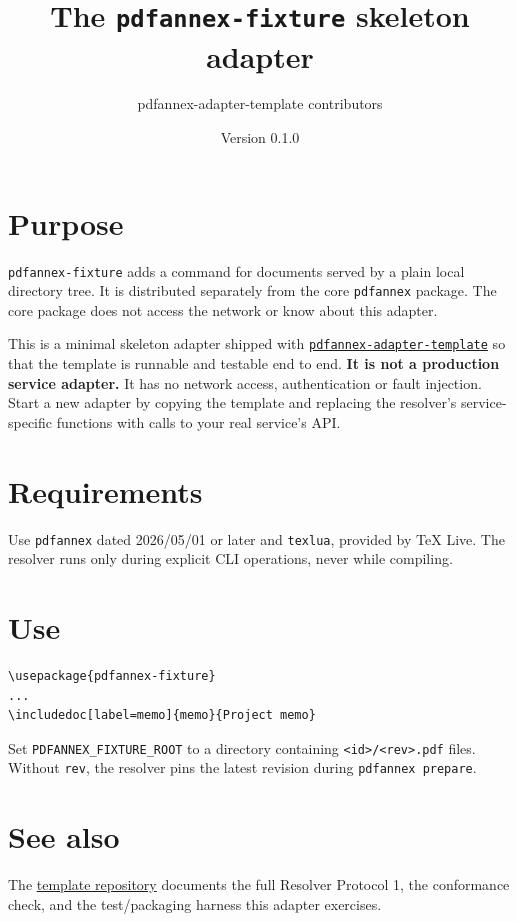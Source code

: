 \documentclass{article}
\title{The \texttt{pdfannex-fixture} skeleton adapter}
\author{pdfannex-adapter-template contributors}
\date{Version 0.1.0} %
\begin{document}
\maketitle

\section{Purpose}

\texttt{pdfannex-fixture} adds a command for documents served by a plain
local directory tree. It is distributed separately from the core
\texttt{pdfannex} package. The core package does not access the network or
know about this adapter.

This is a minimal skeleton adapter shipped with
\href{https://github.com/nocona71/pdfannex-adapter-template}
{\texttt{pdfannex-adapter-template}} so that the template is runnable and
testable end to end. \textbf{It is not a production service adapter.} It has
no network access, authentication or fault injection. Start a new adapter by
copying the template and replacing the resolver's service-specific
functions with calls to your real service's API.

\section{Requirements}

Use \texttt{pdfannex} dated 2026/05/01 or later and \texttt{texlua}, provided
by TeX Live. The resolver runs only during explicit CLI operations, never
while compiling.

\section{Use}

\begin{verbatim}
\usepackage{pdfannex-fixture}
...
\includedoc[label=memo]{memo}{Project memo}
\end{verbatim}

Set \texttt{PDFANNEX\_FIXTURE\_ROOT} to a directory containing
\texttt{<id>/<rev>.pdf} files. Without \texttt{rev}, the resolver pins the
latest revision during \texttt{pdfannex prepare}.

\section{See also}

The \href{https://github.com/nocona71/pdfannex-adapter-template}{template
repository} documents the full Resolver Protocol 1, the conformance check,
and the test/packaging harness this adapter exercises.
\end{document}
